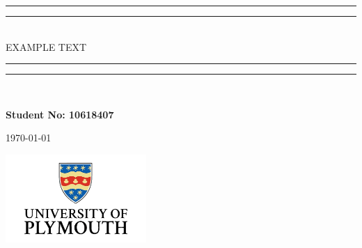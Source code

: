 \documentclass [12pt]{article}
\title{}
\author{}
\date{\today}
\begin{document}
\begin{titlepage}
    \begin{center}
        \vspace*{1cm}

        \vspace*{\baselineskip}

        \rule{\textwidth}{1.6pt}\vspace*{-\baselineskip}\vspace*{2pt}
        \rule{\textwidth}{0.4pt}\\

        {\LARGE EXAMPLE TEXT}\\[0.2\baselineskip]

        \rule{\textwidth}{0.4pt}\vspace*{-\baselineskip}\vspace{3.2pt}
        \rule{\textwidth}{1.6pt}\\[\baselineskip]
        \scshape

        \textbf{Student No: 10618407}

        \today

        \vfill

        \vspace{0.8cm}

        \includegraphics[width=0.4\textwidth]{UOP_Logo.png}

    \end{center}
\end{titlepage}

\newpage
{}
\tableofcontents
\listoffigures
\listoftables
\printglossaries


\end{document}
